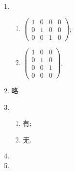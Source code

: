 \documentclass[a4paper, 11pt]{ctexart}
\begin{document}
\begin{enumerate}
    \item %
        \begin{enumerate}[(1)]
            \item %
                $
                    \left(
                        \begin{array}{cccc}
                            1 & 0 & 0 & 0 \\
                            0 & 1 & 0 & 0\\
                            0 & 0 & 1 & 0
                        \end{array}
                    \right)
                $;
            \item %
                $
                    \left(
                        \begin{array}{ccc}
                            1 & 0 & 0 \\
                            0 & 1 & 0 \\
                            0 & 0 & 1 \\
                            0 & 0 & 0
                        \end{array}
                    \right)
                $.
        \end{enumerate}
    \item %
        略.
    \item %
        \begin{enumerate}[(1)]
            \item %
                有;
            \item %
                无.
        \end{enumerate}
    \item %
    \item %
\end{enumerate}
\end{document}
